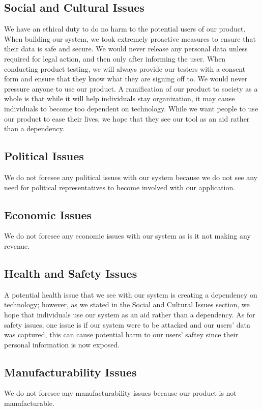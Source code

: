 \subsection{Social and Cultural Issues}
\par We have an ethical duty to do no harm to the potential users of our product. When building our system, we took extremely proactive measures to ensure that their data is safe and secure. We would never release any personal data unless required for legal action, and then only after informing the user. When conducting product testing, we will always provide our testers with a consent form and ensure that they know what they are signing off to. We would never pressure anyone to use our product. A ramification of our product to society as a whole is that while it will help individuals stay organization, it may cause individuals to become too dependent on technology. While we want people to use our product to ease their lives, we hope that they see our tool as an aid rather than a dependency.
\subsection{Political Issues}
\par We do not foresee any political issues with our system because we do not see any need for political representatives to become involved with our application.
\subsection{Economic Issues}
\par We do not foresee any economic issues with our system as is it not making any revenue. 
\subsection{Health and Safety Issues}
\par A potential health issue that we see with our system is creating a dependency on technology; however, as we stated in the Social and Cultural Issues section, we hope that individuals use our system as an aid rather than a dependency. As for safety issues, one issue is if our system were to be attacked and our users' data was captured, this can cause potential harm to our users' saftey since their personal information is now exposed. 
\subsection{Manufacturability Issues}
\par We do not foresee any manufacturability issues because our product is not manufacturable.
